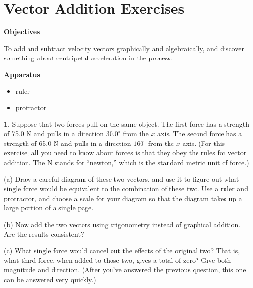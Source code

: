 
\section{Vector Addition Exercises}

\makelabheader %

\textbf{Objectives}

To add and subtract velocity vectors graphically and algebraically, and discover something about centripetal acceleration in the process.


\textbf{Apparatus}
\begin{itemize} \itemsep1pt
\item ruler
\item protractor 
\end{itemize}

\bigskip

{\bf 1}.
Suppose that two forces pull on the same object.  The first force has
a strength of 75.0 N and pulls in a direction $30.0^\circ$ from the $x$
axis.  The second force has a strength of 65.0 N and pulls in a direction 
$160^\circ$ from the $x$ axis.  (For this exercise, all you need
to know about forces is that they obey the rules for vector addition.
The N stands for ``newton,'' which is the standard metric unit of force.)

(a) Draw a careful diagram of these two vectors, and use it to figure out
what single force would be equivalent to the combination of these two.
Use a ruler and protractor, and choose a scale for your diagram so that
the diagram takes up a large portion of a single page.

(b) Now add the two vectors using 
trigonometry instead
of graphical addition.  Are the results consistent?

\vfil\vfil

(c) What single force would cancel out the effects of the original two?  That
is, what third force, when added to those two, gives a total of zero?
Give both magnitude and direction.  (After you've answered the
previous question, this one can be answered very quickly.)

